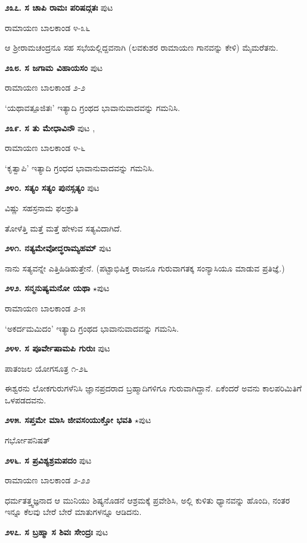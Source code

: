 {\medskip
\noindent\textbf{೨೩೭. ಸ ಚಾಪಿ ರಾಮಃ ಪರಿಷದ್ಗತಃ} \hfill ಪುಟ \pageref{168}

\hfill ರಾಮಾಯಣ ಬಾಲಕಾಂಡ ೪-೩೬

ಆ ಶ್ರೀರಾಮಚಂದ್ರನೂ ಸಹ ಸಭೆಯಲ್ಲಿದ್ದವನಾಗಿ (ಲವಕುಶರ ರಾಮಾಯಣ ಗಾನವನ್ನು ಕೇಳಿ) ಮೈಮರೆತನು.

\medskip
\noindent\textbf{೨೩೮. ಸ ಜಗಾಮ ವಿಹಾಯಸಂ} \hfill ಪುಟ \pageref{163}

\hfill ರಾಮಾಯಣ ಬಾಲಕಾಂಡ ೨-೨

`ಯಥಾವತ್ಪೂಜಿತಃ' ಇತ್ಯಾದಿ ಗ್ರಂಥದ ಭಾವಾನುವಾದವನ್ನು ಗಮನಿಸಿ.

\medskip
\noindent\textbf{೨೩೯. ಸ ತು ಮೇಧಾವಿನೌ} \hfill ಪುಟ \pageref{239},\pageref{240}

\hfill ರಾಮಾಯಣ ಬಾಲಕಾಂಡ ೪-೬

`ಕೃತ್ವಾಪಿ' ಇತ್ಯಾದಿ ಗ್ರಂಧದ ಭಾವಾನುವಾದವನ್ನು ಗಮನಿಸಿ.

\medskip
\noindent\textbf{೨೪೦. ಸತ್ಯಂ ಸತ್ಯಂ ಪುನಸ್ಸತ್ಯಂ} \hfill ಪುಟ \pageref{130}

\hfill ವಿಷ್ಣು ಸಹಸ್ರನಾಮ ಫಲಶ್ರುತಿ

ತೋಳೆತ್ತಿ ಮತ್ತೆ ಮತ್ತೆ ಹೇಳುವ ಸತ್ಯವಿದಾಗಿದೆ.

\medskip
\noindent\textbf{೨೪೧. ನತ್ಯಮೇವೋದ್ಧರಾಮ್ಯಹಮ್} \hfill ಪುಟ \pageref{40}

ನಾನು ಸತ್ಯವನ್ನೇ ಎತ್ತಿಹಿಡಿಹುತ್ತೇನೆ. (ಪಟ್ಟಾಭಿಷಿಕ್ತ ರಾಜನೂ ಗುರುವಾಗತಕ್ಕ ಸಂನ್ಯಾಸಿಯೂ ಮಾಡುವ ಪ್ರತಿಜ್ಞೆ.)

\medskip
\noindent\textbf{೨೪೨. ಸನ್ಮನುಷ್ಯಮನೋ ಯಥಾ} $\star$\hfill ಪುಟ \pageref{197}

\hfill ರಾಮಾಯಣ ಬಾಲಕಾಂಡ ೨-೫

`ಅಕರ್ದಮಮಿದಂ' ಇತ್ಯಾದಿ ಗ್ರಂಥದ ಭಾವಾನುವಾದವನ್ನು ಗಮನಿಸಿ.

\medskip
\noindent\textbf{೨೪೪. ಸ ಪೂರ್ವೇಷಾಮಪಿ ಗುರುಃ} \hfill ಪುಟ \pageref{129}

\hfill ಪಾತಂಜಲ ಯೋಗಸೂತ್ರ ೧-೨೬

ಈಶ್ವರನು ಲೋಕಗುರುಗಳೆನಿಸಿ ಜ್ಞಾನಪ್ರದರಾದ ಬ್ರಹ್ಮಾದಿಗಳಿಗೂ ಗುರುವಾಗಿದ್ದಾನೆ. ಏಕೆಂದರೆ ಅವನು ಕಾಲಪರಿಮಿತಿಗೆ ಒಳಪಡದವನು.

\medskip
\noindent\textbf{೨೪೫. ಸಪ್ತಮೇ ಮಾಸಿ ಜೀವಸಂಯುಕ್ತೋ ಭವತಿ} $\star$\hfill ಪುಟ \pageref{85}

\hfill ಗರ್ಭೋಪನಿಷತ್

\medskip
\noindent\textbf{೨೪೬. ಸ ಪ್ರವಿಶ್ಯಶ್ರಮಪದಂ} \hfill ಪುಟ \pageref{201}

\hfill ರಾಮಾಯಣ ಬಾಲಕಾಂಡ ೨-೨೨

ಧರ್ಮತತ್ತ್ವಜ್ಞನಾದ ಆ ಮುನಿಯು ಶಿಷ್ಯನೊಡನೆ ಆಶ್ರಮಕ್ಕೆ ಪ್ರವೇಶಿಸಿ, ಅಲ್ಲಿ ಕುಳಿತು ಧ್ಯಾನವನ್ನು ಹೊಂದಿ, ನಂತರ ಇನ್ನೂ ಕೆಲವು ಬೇರೆ ಬೇರೆ ಮಾತುಗಳನ್ನೂ ಆಡಿದನು.

\medskip
\noindent\textbf{೨೪೭. ಸ ಬ್ರಹ್ಮಾ ಸ ಶಿವಃ ಸೇಂದ್ರಃ} \hfill ಪುಟ \pageref{249}

}
